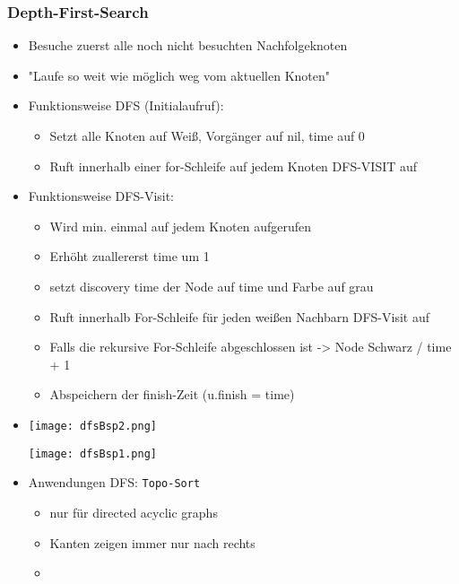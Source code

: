 \begin{itemize}
\subsubsection{Depth-First-Search}
\begin{itemize}
    \item Besuche zuerst alle noch nicht besuchten Nachfolgeknoten
    \item \string"Laufe so weit wie möglich weg vom aktuellen Knoten\string"
    \item Funktionsweise DFS (Initialaufruf):
        \begin{itemize}
            \item Setzt alle Knoten auf Weiß, Vorgänger auf nil, time auf 0
            \item Ruft innerhalb einer for-Schleife auf jedem Knoten DFS-VISIT auf
        \end{itemize}
    \item Funktionsweise DFS-Visit:
        \begin{itemize}
            \item Wird min. einmal auf jedem Knoten aufgerufen
            \item Erhöht zuallererst time um 1
            \item setzt discovery time der Node auf time und Farbe auf grau
            \item Ruft innerhalb For-Schleife für jeden weißen Nachbarn DFS-Visit auf
            \item Falls die rekursive For-Schleife abgeschlossen ist -> Node Schwarz / time + 1
            \item Abspeichern der finish-Zeit (u.finish = time)
        \end{itemize}
    \item[]
        \begin{minipage}{0.3\textwidth}
            \texttt{[image: dfsBsp2.png]}
        \end{minipage}
        \begin{minipage}{0.45\textwidth}
            \texttt{[image: dfsBsp1.png]}
        \end{minipage}
    \item Anwendungen DFS: \texttt{Topo-Sort}
        \begin{itemize}
            \item nur für directed acyclic graphs
            \item Kanten zeigen immer nur nach rechts
            \item[]

\end{itemize}
\end{itemize}
\end{itemize}
